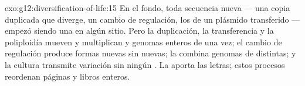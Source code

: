 \begin{solution}{exo:g12:diversification-of-life:15}
En el fondo, toda secuencia nueva --- una copia duplicada que diverge,
un cambio de regulación, los  de un plásmido transferido ---
empezó siendo una  en algún sitio. Pero la duplicación, la
transferencia y la poliploidía mueven y multiplican  y genomas
enteros de una vez; el cambio de regulación produce formas nuevas sin
 nuevas; la  combina genomas de  distintas; y
la cultura transmite variación sin ningún . La  aporta las
letras; estos procesos reordenan páginas y libros enteros.
\end{solution}

